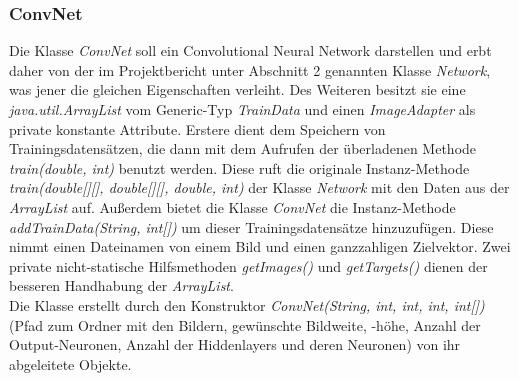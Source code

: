 \documentclass[paper=A4,pagesize=auto,12pt,headinclude=true,footinclude=true,BCOR=0mm,DIV=calc]{scrartcl}
\begin{document}
\subsubsection{ConvNet} %
Die Klasse \textit{ConvNet} soll ein Convolutional Neural Network darstellen und erbt daher von der im Projektbericht \cite{projektbericht} unter Abschnitt 2 genannten Klasse \textit{Network}, was jener die gleichen Eigenschaften verleiht. Des Weiteren besitzt sie eine \textit{java.util.ArrayList} vom Generic-Typ \textit{TrainData} und einen \textit{ImageAdapter} als private konstante Attribute. Erstere dient dem Speichern von Trainingsdatensätzen, die dann mit dem Aufrufen der überladenen Methode \textit{train(double, int)} benutzt werden. Diese ruft die originale Instanz-Methode \textit{train(double[][], double[][], double, int)} der Klasse \textit{Network} mit den Daten aus der \textit{ArrayList} auf.
Außerdem bietet die Klasse \textit{ConvNet} die Instanz-Methode \textit{addTrainData(String, int[])} um dieser Trainingsdatensätze hinzuzufügen. Diese nimmt einen Dateinamen von einem Bild und einen ganzzahligen Zielvektor. Zwei private nicht-statische Hilfsmethoden \textit{getImages()} und \textit{getTargets()} dienen der besseren Handhabung der \textit{ArrayList}.\\
Die Klasse erstellt durch den Konstruktor \textit{ConvNet(String, int, int, int, int[])} (Pfad zum Ordner mit den Bildern, gewünschte Bildweite, -höhe, Anzahl der Output-Neuronen, Anzahl der Hiddenlayers und deren Neuronen) von ihr abgeleitete Objekte.
\end{document}
